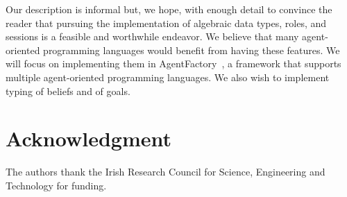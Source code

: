\documentclass[conference,compsoc]{IEEEtran} %
\begin{document}
Our description is informal but, we hope, with enough detail to convince
the reader that pursuing the implementation of algebraic data types, roles,
and sessions is a feasible and worthwhile endeavor. We believe that many
agent-oriented programming languages would benefit from having these
features. We will focus on implementing them in
AgentFactory~\cite{phd:rem}, a framework that supports multiple
agent-oriented programming languages.  We also wish to implement typing of
beliefs and of goals.

\section*{Acknowledgment}

The authors thank the Irish Research Council for Science, Engineering and
Technology for funding.




\end{document}
